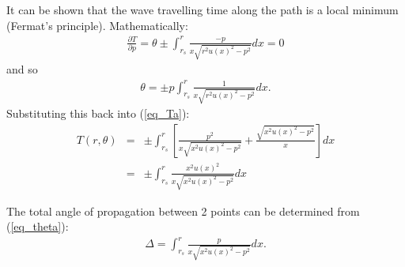\documentclass{mm2}
\begin{document}
It can be shown \cite{Rawlinson} that the wave travelling time along the 
path is a local minimum (Fermat's principle).
Mathematically:
\begin{eqnarray}
\frac{\partial T}{\partial p} =  \theta \pm 
\int_{r_s}^r \frac{-p}{x\sqrt{r^2 u(x)^2 - p^2}} dx=0
\label{eq_dTdp} 
\end{eqnarray} 
and so
\begin{eqnarray}
\theta = \pm p
\int_{r_s}^r \frac{1}{x\sqrt{r^2 u(x)^2 - p^2}} dx.
\label{eq_theta} 
\end{eqnarray} 
Substituting this back into (\ref{eq_Ta}):
\begin{eqnarray}
T(r,\theta) &=&\pm \int_{r_s}^{r}\left[  \frac{p^2}{x\sqrt{x^2 u(x)^2 - p^2}} +
  \frac{\sqrt{x^2 u(x)^2 -p^2}}{x} \right]dx\\
&=&\pm \int_{r_s}^{r}  \frac{x^2u(x)^2}{x\sqrt{x^2 u(x)^2 - p^2}} dx
\label{eq_Tb} 
\end{eqnarray}

The total angle of propagation between 2 points can be determined from 
(\ref{eq_theta}):
\begin{eqnarray}
\Delta = \int_{r_s}^{r} \frac{p}{x\sqrt{x^2u(x)^2 - p^2}} dx.
\label{eq_delta} 
\end{eqnarray} 
\end{document}
